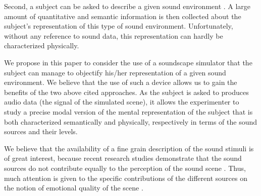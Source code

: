 \documentclass[12pt]{elsarticle}
\newcommand{\ie}{\emph{i.\,e.}}
\newcommand{\eg}{\emph{e.\,g.}}
\begin{document}
Second, a subject can be asked to describe a given sound environment \cite{guastavino2006ideal, dubois2006cognitive}. A large amount of quantitative and semantic information is then collected about the subject's representation of this type of sound environment. Unfortunately, without any reference to sound data, this representation can hardly be characterized physically.


We propose in this paper to consider the use of a soundscape simulator that the subject can manage to objectify his/her representation of a given sound environment. We believe that the use of such a device allows us to gain the benefits of the two above cited approaches. As the subject is asked to produces audio data (the signal of the simulated scene), it allows the experimenter to study a precise modal version of the mental representation of the subject that is both characterized semantically and physically, respectively in terms of the sound sources and their levels.


We believe that the availability of a fine grain description of the sound stimuli is of great interest, because recent research studies demonstrate that the sound sources do not contribute equally to the perception of the sound scene \cite{defreville2004aactivity,lavandier2006contribution,guastavino2006ideal,nilsson2007soundscape,
szeremeta2009analysis}. Thus, much attention is given to the specific contributions of the different sources on the notion of emotional quality of the scene \cite{gozalo2015relationship,ricciardi2015sound}.
\end{document}
